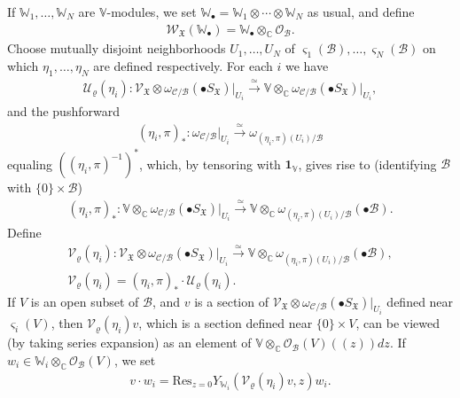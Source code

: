 \documentclass[12pt,b5paper,notitlepage]{report}
\theoremstyle{definition}
\theoremstyle{plain}
\newcommand{\fk}{\mathfrak}
\newcommand{\mc}{\mathcal}
\newcommand{\id}{\mathbf{1}}
\newcommand{\Res}{\mathrm{Res}}
\newcommand{\scr}{\mathscr}
\newcommand{\sgm}{\varsigma}
\newcommand{\blt}{\bullet}
\newcommand{\Vbb}{\mathbb V}
\newcommand{\Wbb}{\mathbb W}
\newcommand{\Cbb}{\mathbb C}
\numberwithin{equation}{section}
\begin{document}
If $\Wbb_1,\dots,\Wbb_N$ are $\Vbb$-modules, we set $\Wbb_\blt=\Wbb_1\otimes \cdots\otimes \Wbb_N$ as usual, and define
\begin{align}
\scr W_{\fk X}(\Wbb_\blt)=\Wbb_\blt\otimes_{\Cbb}\scr O_{\mc B}.
\end{align}
Choose mutually disjoint neighborhoods $U_1,\dots,U_N$ of $\sgm_1(\mc B),\dots,\sgm_N(\mc B)$ on which $\eta_1,\dots,\eta_N$ are defined respectively. For each $i$ we have
\begin{gather*}
\mc U_\varrho(\eta_i):\scr V_{\fk X}\otimes\omega_{\mc C/\mc B}(\blt S_{\fk X})\big|_{U_i}\xrightarrow{\simeq}\Vbb\otimes_{\Cbb}\omega_{\mc C/\mc B}(\blt S_{\fk X})\big|_{U_i},
\end{gather*}
and the  pushforward
\begin{gather*}
(\eta_i,\pi)_*:\omega_{\mc C/\mc B}\big|_{U_i}\xrightarrow{\simeq}\omega_{(\eta_i,\pi)(U_i)/\mc B}
\end{gather*}
equaling $((\eta_i,\pi)^{-1})^*$, which, by tensoring with $\id_\Vbb$, gives rise to (identifying $\mc B$ with $\{0\}\times\mc B$)
\begin{gather*}
(\eta_i,\pi)_*:\Vbb\otimes_{\Cbb}\omega_{\mc C/\mc B}(\blt S_{\fk X})\big|_{U_i}\xrightarrow{\simeq}\Vbb\otimes_{\Cbb}\omega_{(\eta_i,\pi)(U_i)/\mc B}(\blt \mc B).
\end{gather*}
Define \index{UV@$\mc U_\varrho(\eta),\mc U_\varrho(\varphi),\mc V_\varrho(\eta),\mc V_\varrho(\varphi)$}
\begin{gather}
\mc V_\varrho(\eta_i):\scr V_{\fk X}\otimes\omega_{\mc C/\mc B}(\blt S_{\fk X})\big|_{U_i}\xrightarrow{\simeq}\Vbb\otimes_{\Cbb}\omega_{(\eta_i,\pi)(U_i)/\mc B}(\blt \mc B),\nonumber\\
\mc V_{\varrho}(\eta_i)=(\eta_i,\pi)_*\cdot \mc U_{\varrho}(\eta_i).
\end{gather}
If $V$ is an open subset of $\mc B$, and $v$ is a section of $\scr V_{\fk X}\otimes\omega_{\mc C/\mc B}(\blt S_{\fk X})\big|_{U_i}$ defined near $\sgm_i(V)$, then $\mc V_\varrho(\eta_i)v$, which is a section defined near $\{0\}\times V$, can be viewed (by taking series expansion) as an element of $\Vbb\otimes_\Cbb\scr O_{\mc B}(V)((z))dz$. If $w_i\in\Wbb_i\otimes_\Cbb\scr O_{\mc B}(V)$, we set \index{vw@$v\cdot w_i,v\cdot w_\blt$}
\begin{align}
v\cdot w_i=\Res_{z=0}Y_{\Wbb_i}(\mc V_\varrho(\eta_i)v,z)w_i.\label{eq116}
\end{align}
\end{document}
